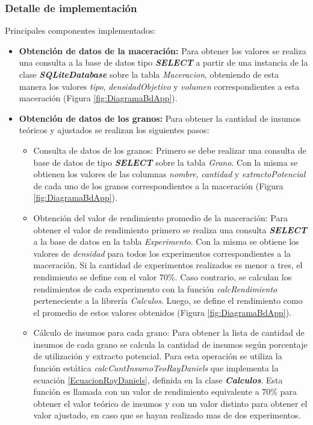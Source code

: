             \subsubsection{Detalle de implementación}
            \par Principales componentes implementados:
            \begin{itemize}
                \item \textbf{Obtención de datos de la maceración:} Para obtener los valores se realiza una consulta a la base de datos tipo \textbf{ \textit{\gls{SELECT}}} a partir de una instancia de la clase \textbf{\textit{\gls{SQLiteDatabase}}} sobre la tabla \textit{Maceracion}, obteniendo de esta manera los valores \textit{tipo}, \textit{densidadObjetivo} y \textit{volumen} correspondientes a esta maceración (Figura \ref{fig:DiagramaBdApp}). 
                
                \item \textbf{Obtención de datos de los granos:} 
                    Para obtener la cantidad de insumos teóricos y ajustados se realizan los siguientes pasos:
                    \begin{itemize}
                        \item Consulta de datos de los granos: Primero se debe realizar una consulta de base de datos de tipo \textbf{\textit{\gls{SELECT}}} sobre la tabla \textit{Grano}. Con la misma se obtienen los valores de las columnas \textit{nombre}, \textit{cantidad} y \textit{extractoPotencial} de cada uno de los granos correspondientes a la maceración (Figura \ref{fig:DiagramaBdApp}).
                        
                        \item Obtención del valor de rendimiento promedio de la maceración: Para obtener el valor de rendimiento primero se realiza una consulta \textbf{\textit{\gls{SELECT}}} a la base de datos en la tabla \textit{Experimento}. Con la misma se obtiene los valores de \textit{densidad} para todos los experimentos correspondientes a la maceración. Si la cantidad de experimentos realizados es menor a tres, el rendimiento se define con el valor 70\%. Caso contrario, se calculan los rendimientos de cada experimento con la función \textit{calcRendimiento} perteneciente a la librería \textit{Calculos}. Luego, se define el rendimiento como el promedio de estos valores obtenidos (Figura \ref{fig:DiagramaBdApp}).
                        
                        \item Cálculo de insumos para cada grano: Para obtener la lista de cantidad de insumos de cada grano se calcula la cantidad de insumos según porcentaje de utilización y extracto potencial. Para esta operación se utiliza la función estática \textit{calcCantInsumoTeoRayDaniels} que implementa la ecuación \ref{EcuacionRayDaniels}, definida en la clase \textbf{\textit{Calculos}}. Esta función es llamada con un valor de rendimiento equivalente a 70\% para obtener el valor teórico de insumos y con un valor distinto para obtener el valor ajustado, en caso que se hayan realizado mas de dos experimentos.
                        

\end{itemize}
\end{itemize}
